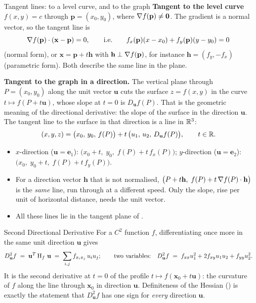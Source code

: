 \begin{rulebox}{Tangent lines: to a level curve, and to the graph}
\textbf{Tangent to the level curve} $f(x,y)=c$ through
$\mathbf{p}=(x_{0},y_{0})$, where $\nabla f(\mathbf{p})\neq\mathbf{0}$. The
gradient is a normal vector, so the tangent line is
\[
  \nabla f(\mathbf{p})\cdot(\mathbf{x}-\mathbf{p})=0,
  \qquad\text{i.e.}\qquad
  f_{x}(\mathbf{p})(x-x_{0})+f_{y}(\mathbf{p})(y-y_{0})=0
\]
(normal form), or $\mathbf{x}=\mathbf{p}+t\mathbf{h}$ with
$\mathbf{h}\perp\nabla f(\mathbf{p})$, for instance
$\mathbf{h}=(f_{y},-f_{x})$ (parametric form). Both describe the same
line in the plane.

\textbf{Tangent to the graph in a direction.} The vertical plane through
$P=(x_{0},y_{0})$ along the unit vector $\mathbf{u}$ cuts the surface
$z=f(x,y)$ in the curve $t\mapsto f(P+t\mathbf{u})$, whose slope at $t=0$
is $D_{\mathbf{u}}f(P)$. That is the geometric meaning of the directional
derivative: the slope of the surface in the direction $\mathbf{u}$. The
tangent line to the surface in that direction is a line in $\mathbb{R}^{3}$:
\[
  (x,y,z)=\bigl(x_{0},\,y_{0},\,f(P)\bigr)
          +t\,\bigl(u_{1},\,u_{2},\,D_{\mathbf{u}}f(P)\bigr),\qquad t\in\mathbb{R} .
\]
\begin{itemize}[leftmargin=1.6em,itemsep=0.3ex]
  \item $x$-direction ($\mathbf{u}=\mathbf{e}_{1}$):
        $\bigl(x_{0}+t,\;y_{0},\;f(P)+t\,f_{x}(P)\bigr)$;
        $y$-direction ($\mathbf{u}=\mathbf{e}_{2}$):
        $\bigl(x_{0},\;y_{0}+t,\;f(P)+t\,f_{y}(P)\bigr)$.
  \item For a direction vector $\mathbf{h}$ that is not normalised,
        $\bigl(P+t\mathbf{h},\;f(P)+t\,\nabla f(P)\cdot\mathbf{h}\bigr)$ is
        the \emph{same} line, run through at a different speed. Only the
        slope, rise per unit of horizontal distance, needs the unit vector.
  \item All these lines lie in the tangent plane of .
\end{itemize}
\end{rulebox}

\begin{rulebox}{Second Directional Derivative}
For a $C^{2}$ function $f$, differentiating once more in the same unit
direction $\mathbf{u}$ gives
\[
  D^{2}_{\mathbf{u}}f
  \;=\; \mathbf{u}^{T}\operatorname{H}_{f}\,\mathbf{u}
  \;=\; \sum_{i,j} f_{x_{i}x_{j}}\,u_{i}u_{j} ;
  \qquad\text{two variables:}\quad
  D^{2}_{\mathbf{u}}f
  \;=\; f_{xx}u_{1}^{2}+2f_{xy}u_{1}u_{2}+f_{yy}u_{2}^{2} .
\]
It is the second derivative at $t=0$ of the profile
$t\mapsto f(\mathbf{x}_{0}+t\mathbf{u})$: the curvature of $f$ along the
line through $\mathbf{x}_{0}$ in direction $\mathbf{u}$. Definiteness of
the Hessian () is exactly the statement that
$D^{2}_{\mathbf{u}}f$ has one sign for \emph{every} direction
$\mathbf{u}$.
\end{rulebox}

